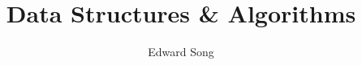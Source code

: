 \documentclass{article}
\begin{document}
\title{Data Structures \& Algorithms}
\author{Edward Song}
\maketitle
\thispagestyle{empty}
















\end{document}
